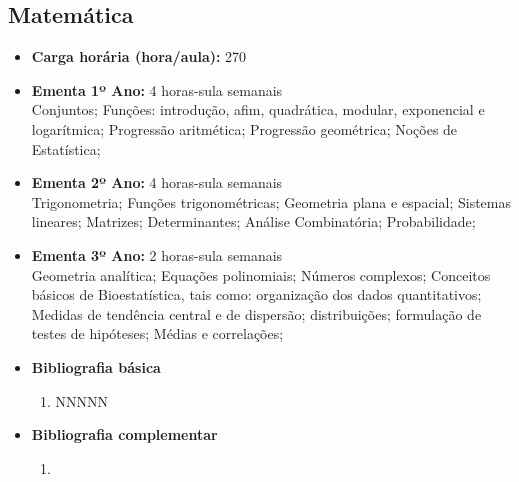 \documentclass[11pt,fleqn]{book} %
\begin{document}
\newpage
\subsection{Matemática}\label{disc:matematica}
\begin{itemize}
	\item \textbf{Carga horária (hora/aula):} 270
	\item \textbf{Ementa 1º Ano:} 4 horas-sula semanais\\
	Conjuntos;
	Funções: introdução, afim, quadrática, modular, exponencial e logarítmica;
	Progressão aritmética;
	Progressão geométrica;
	Noções de Estatística;
	
	\item \textbf{Ementa 2º Ano:} 4 horas-sula semanais\\
	Trigonometria;
	Funções trigonométricas;
	Geometria plana e espacial;
	Sistemas lineares;
	Matrizes;
	Determinantes;
	Análise Combinatória;
	Probabilidade;
		
	\item \textbf{Ementa 3º Ano:} 2 horas-sula semanais\\
	Geometria analítica; 
	Equações polinomiais; 
	Números complexos; 
	Conceitos básicos de Bioestatística, tais como: organização dos dados quantitativos;
	Medidas de tendência central e de dispersão; distribuições; formulação de testes de hipóteses; 
	Médias e correlações;
	

	\item \textbf{Bibliografia básica}
	\begin{enumerate}
		\item NNNNN
	\end{enumerate}
	\item \textbf{Bibliografia complementar}
	\begin{enumerate}
		\item 
	\end{enumerate}	
\end{itemize}

\newpage
\end{document}
